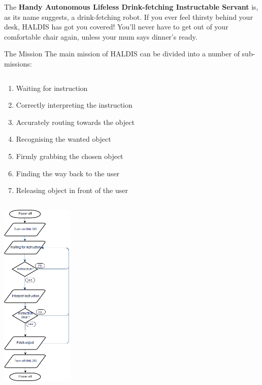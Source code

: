 \documentclass{beamer}
\begin{document}
\begin{frame}[t,fragile]
\begin{columns}[T,totalwidth=\textwidth]
	\begin{column}{.48\textwidth}
	The \textbf{Handy Autonomous Lifeless Drink-fetching Instructable Servant} is, as its name suggests, a drink-fetching robot. 
	If you ever feel thirsty behind your desk, HALDIS has got you covered! You'll never have to get out of your comfortable chair again, unless your mum says dinner's ready.
	\break
	\begin{block}{The Mission}
	The main mission of HALDIS can be divided into a number of sub-missions:
	\break
	\begin{column}{.6\textwidth}
	\begin{enumerate}
	    \item Waiting for instruction
	    \break
	    \item Correctly interpreting the instruction
	    \break
	    \item Accurately routing towards the object
	    \break
	    \item Recognising the wanted object 
	    \break
	    \item Firmly grabbing the chosen object
	    \break
	    \item Finding the way back to the user
	    \break
	    \item Releasing object in front of the user 
	\end{enumerate}
	\end{column}
	\begin{column}{.30\textwidth}
    	\includegraphics[width=35mm]{graphics/Flowchart.png}
	\end{column}
	\end{block}
	

\end{column}
\end{columns}
\end{frame}
\end{document}
